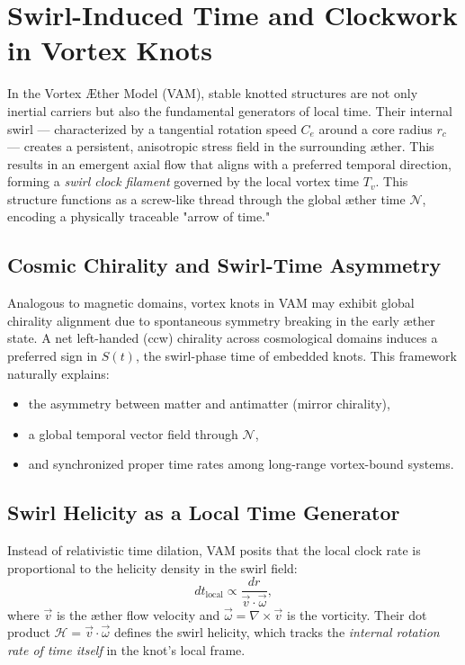 \section{Swirl-Induced Time and Clockwork in Vortex Knots}

In the Vortex \AE{}ther Model (VAM), stable knotted structures are not only inertial carriers but also the fundamental generators of local time. Their internal swirl — characterized by a tangential rotation speed \( C_e \) around a core radius \( r_c \) — creates a persistent, anisotropic stress field in the surrounding æther. This results in an emergent axial flow that aligns with a preferred temporal direction, forming a \emph{swirl clock filament} governed by the local vortex time \( T_v \). This structure functions as a screw-like thread through the global æther time \( \mathcal{N} \), encoding a physically traceable "arrow of time."

\subsection*{Cosmic Chirality and Swirl-Time Asymmetry}

Analogous to magnetic domains, vortex knots in VAM may exhibit global chirality alignment due to spontaneous symmetry breaking in the early æther state. A net left-handed (ccw) chirality across cosmological domains induces a preferred sign in \( S(t) \), the swirl-phase time of embedded knots. This framework naturally explains:
\begin{itemize}
  \item the asymmetry between matter and antimatter (mirror chirality),
  \item a global temporal vector field through \( \mathcal{N} \),
  \item and synchronized proper time rates among long-range vortex-bound systems.
\end{itemize}

\subsection*{Swirl Helicity as a Local Time Generator}

Instead of relativistic time dilation, VAM posits that the local clock rate is proportional to the helicity density in the swirl field:
\[
    dt_{\text{local}} \propto \frac{dr}{\vec{v} \cdot \vec{\omega}},
\]
where \( \vec{v} \) is the æther flow velocity and \( \vec{\omega} = \nabla \times \vec{v} \) is the vorticity. Their dot product \( \mathcal{H} = \vec{v} \cdot \vec{\omega} \) defines the swirl helicity, which tracks the \emph{internal rotation rate of time itself} in the knot’s local frame.

